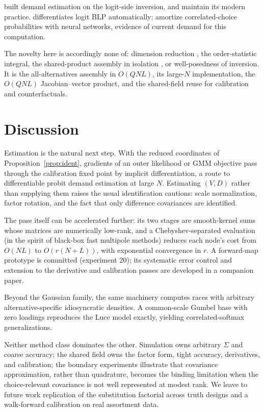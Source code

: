 \documentclass[12pt]{article}
\theoremstyle{remark}
\begin{document}
 \citet{berry1995} built demand
estimation on the logit-side inversion, and \citet{conlon2020}
maintain its modern practice. \citet{chia2021}
differentiates logit BLP automatically; \citet{huch2026}
amortize correlated-choice probabilities with neural networks, evidence of
current demand for this computation.

The novelty here is accordingly none of: dimension reduction
\citep{curnow1962}, the order-statistic integral, the shared-product
assembly in isolation \citep{mahani2019,cotton2021}, or well-posedness of
inversion. It is the
all-alternatives assembly in $O(QNL)$, its large-$N$ implementation, the
$O(QNL)$ Jacobian--vector product, and the shared-field reuse for
calibration and counterfactuals.

\section{Discussion}\label{sec:discussion}

Estimation is the natural next step. With the reduced coordinates of
Proposition~\ref{prop:ident}, gradients of an outer likelihood or GMM
objective pass through the calibration fixed point by implicit
differentiation, a route to differentiable probit demand estimation at large
$N$. Estimating $(V, D)$ rather than supplying them raises the usual
identification cautions: scale normalization, factor rotation, and the fact
that only difference covariances are identified.

The pass itself can be accelerated further: its two stages are smooth-kernel
sums whose matrices are numerically low-rank, and a Chebyshev-separated
evaluation (in the spirit of black-box fast multipole methods) reduces
each node's cost from $O(NL)$ to $O(r(N+L))$, with exponential
convergence in $r$. A forward-map prototype is committed (experiment
20); its systematic error control and extension to the derivative and
calibration passes are developed in a companion paper.

Beyond the Gaussian family, the same machinery computes races with arbitrary
alternative-specific idiosyncratic densities. A common-scale Gumbel base with
zero loadings reproduces the Luce model exactly, yielding correlated-softmax
generalizations.

Neither method class dominates the other. Simulation owns arbitrary
$\Sigma$ and coarse accuracy; the shared field owns the factor form,
tight accuracy, derivatives, and calibration; the boundary experiments
illustrate that covariance approximation, rather than quadrature,
becomes the binding limitation when the choice-relevant covariance is
not well represented at modest rank. We leave to future work
replication of the substitution factorial across truth designs and a
walk-forward calibration on real assortment data.
\end{document}
